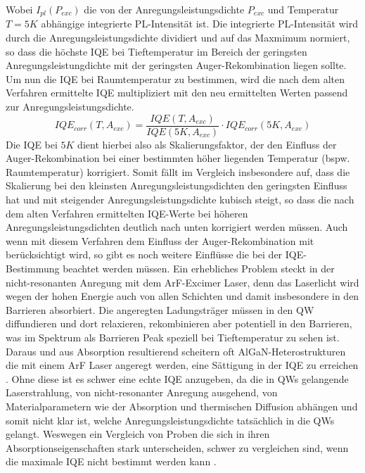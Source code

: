 Wobei $I_{pl}(P_{exc})$ die von der Anregungsleistungsdichte $P_{exc}$ und Temperatur $T = 5K$ abhängige integrierte PL-Intensität ist. Die integrierte PL-Intensität wird durch die Anregungsleistungsdichte dividiert und auf das Maxmimum normiert, so dass die höchste IQE bei Tieftemperatur im Bereich der geringsten Anregungsleistungdichte mit der geringsten Auger-Rekombination liegen sollte. Um nun die IQE bei Raumtemperatur zu bestimmen, wird die nach dem alten Verfahren ermittelte IQE multipliziert mit den neu ermittelten Werten passend zur Anregungsleistungsdichte. 
\begin{equation}
    IQE_{corr}(T, A_{exc}) = \frac{IQE(T,A_{exc})}{IQE(5K,A_{exc})} \cdot IQE_{corr}(5K,A_{exc})
    \label{eq:iqetrue300k}
\end{equation}
Die IQE bei $5K$ dient hierbei also als Skalierungsfaktor, der den Einfluss der Auger-Rekombination bei einer bestimmten höher liegenden Temperatur (bspw. Raumtemperatur) korrigiert. Somit fällt im Vergleich insbesondere auf, dass die Skalierung bei den kleinsten Anregungsleistungsdichten den geringsten Einfluss hat und mit steigender Anregungsleistungsdichte kubisch steigt, so dass die nach dem alten Verfahren ermittelten IQE-Werte bei höheren Anregungsleistungsdichten deutlich nach unten korrigiert werden müssen. \newline
Auch wenn mit diesem Verfahren dem Einfluss der Auger-Rekombination mit berücksichtigt wird, so gibt es noch weitere Einflüsse die bei der IQE-Bestimmung beachtet werden müssen. Ein erhebliches Problem steckt in der nicht-resonanten Anregung mit dem ArF-Excimer Laser, denn das Laserlicht wird wegen der hohen Energie auch von allen Schichten und damit insbesondere in den Barrieren absorbiert. Die angeregten Ladungsträger müssen in den QW diffundieren und dort relaxieren, rekombinieren aber potentiell in den Barrieren, was im Spektrum als Barrieren Peak speziell bei Tieftemperatur zu sehen ist.
\newline
Daraus und aus Absorption resultierend scheitern oft AlGaN-Heterostrukturen die mit einem ArF Laser angeregt werden, eine Sättigung in der IQE zu erreichen \cite{doi:10.1063/1.4965298}. Ohne diese ist es schwer eine echte IQE anzugeben, da die in QWs gelangende Laserstrahlung, von nicht-resonanter Anregung ausgehend, von Materialparametern wie der Absorption und thermischen Diffusion abhängen und somit nicht klar ist, welche Anregungsleistungsdichte tatsächlich in die QWs gelangt. Weswegen ein Vergleich von Proben die sich in ihren Absorptionseigenschaften stark unterscheiden, schwer zu vergleichen sind, wenn die maximale IQE nicht bestimmt werden kann \cite{doi:10.1063/1.5044383}. 

